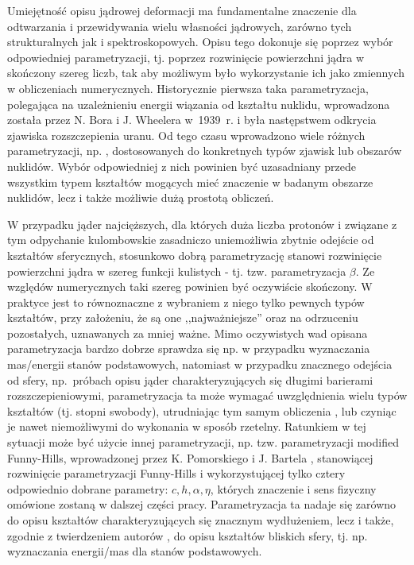 \documentclass[a4paper,polish]{article}
\numberwithin{equation}{section}
\begin{document}
Umiejętność opisu jądrowej deformacji ma fundamentalne znaczenie dla odtwarzania i przewidywania wielu własności jądrowych, zarówno tych strukturalnych jak i spektroskopowych. Opisu tego dokonuje się poprzez wybór odpowiedniej parametryzacji, tj. poprzez rozwinięcie powierzchni jądra w skończony szereg liczb, tak aby możliwym było wykorzystanie ich jako zmiennych w obliczeniach numerycznych. Historycznie pierwsza taka parametryzacja, polegająca na uzależnieniu energii wiązania od kształtu nuklidu, wprowadzona została przez N. Bora i J. Wheelera w~1939~r. \cite{1939} i była następstwem odkrycia zjawiska rozszczepienia uranu. Od tego czasu wprowadzono wiele różnych parametryzacji, np. \cite{parametryzacje}, dostosowanych do konkretnych typów zjawisk lub obszarów nuklidów. Wybór odpowiedniej z nich powinien być uzasadniany przede wszystkim typem kształtów mogących mieć znaczenie w badanym obszarze nuklidów, lecz i także możliwie dużą prostotą obliczeń.

W przypadku jąder najcięższych, dla których duża liczba protonów i związane z tym odpychanie kulombowskie zasadniczo uniemożliwia zbytnie odejście od kształtów sferycznych, stosunkowo dobrą parametryzację stanowi rozwinięcie powierzchni jądra w szereg funkcji kulistych - tj. tzw. parametryzacja $\beta$. Ze względów numerycznych taki szereg powinien być oczywiście skończony. W praktyce jest to równoznaczne z wybraniem z niego tylko pewnych typów kształtów, przy założeniu, że są one ,,najważniejsze'' oraz na odrzuceniu pozostałych, uznawanych za mniej ważne. Mimo oczywistych wad opisana parametryzacja bardzo dobrze sprawdza się np. w przypadku wyznaczania mas/energii stanów podstawowych, natomiast w przypadku znacznego odejścia od sfery, np.~próbach opisu jąder charakteryzujących się długimi barierami rozszczepieniowymi, parametryzacja ta może wymagać uwzględnienia wielu typów kształtów (tj. stopni swobody), utrudniając tym samym obliczenia \cite{Jach1}, lub czyniąc je nawet niemożliwymi do wykonania w sposób rzetelny. Ratunkiem w tej sytuacji może być użycie innej parametryzacji, np. tzw. parametryzacji modified Funny-Hills, wprowadzonej przez K. Pomorskiego i J. Bartela \cite{MFH}, stanowiącej rozwinięcie parametryzacji Funny-Hills \cite{OLDMFH} i wykorzystującej tylko cztery odpowiednio dobrane parametry: $c, h, \alpha, \eta$, których znaczenie i sens fizyczny omówione zostaną w dalszej części pracy. Parametryzacja ta nadaje się zarówno do opisu kształtów charakteryzujących się znacznym wydłużeniem, lecz i także, zgodnie z twierdzeniem autorów \cite{MFH}, do opisu kształtów bliskich sfery, tj. np. wyznaczania energii/mas dla stanów podstawowych.
\end{document}
